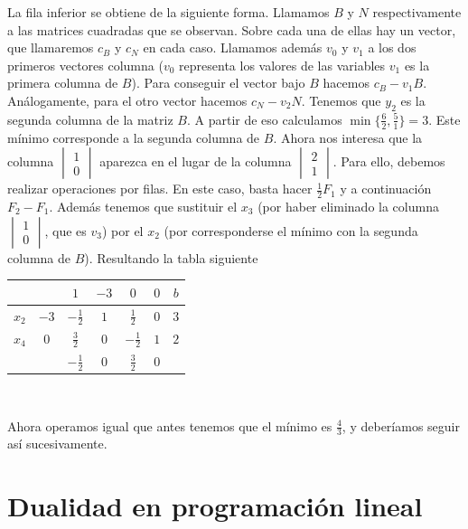 \documentclass[PM.tex]{subfiles}
\begin{document}
La fila inferior se obtiene de la siguiente forma. Llamamos $B$ y $N$ respectivamente a las matrices cuadradas que se observan. Sobre cada una de ellas hay un vector, que llamaremos $c_B$ y $c_N$ en cada caso. Llamamos además $v_0$ y $v_1$ a los dos primeros vectores columna ($v_0$ representa los valores de las variables $v_1$ es la primera columna de $B$). Para conseguir el vector bajo $B$ hacemos $c_B-v_1 B$. Análogamente, para el otro vector hacemos $c_N-v_2 N$. Tenemos que $y_2$ es la segunda columna de la matriz $B$. A partir de eso calculamos $\min\{\frac{6}{2}, \frac{5}{1}\}=3$. Este mínimo corresponde a la segunda columna de $B$. Ahora nos interesa que la columna $\begin{vmatrix}
1\\
0
\end{vmatrix}$ aparezca en el lugar de la columna $\begin{vmatrix}
2\\
1
\end{vmatrix}$. Para ello, debemos realizar operaciones por filas. En este caso, basta hacer $\frac{1}{2}F_1$ y a continuación $F_2-F_1$. Además tenemos que sustituir el $x_3$ (por haber eliminado la columna $\begin{vmatrix}
1\\
0
\end{vmatrix}$, que es $v_3$) por el $x_2$ (por corresponderse el mínimo con la segunda columna de $B$). Resultando la tabla siguiente

\begin{tabular}{|c|c| c c| c c|c|}
\hline
 &            & $1$ & $-3$ & $0$ & $0$ & $b$  \\
 \hline
 $x_2$ & $-3$ & $-\frac{1}{2}$ & $1$ &   $\frac{1}{2}$ &   $0$ & $3$\\
  $x_4$ & $0$ & $\frac{3}{2}$ & $0$ &    $-\frac{1}{2}$ &  $1$ & $2$\\
 \hline
 &            & $\boxed{-\frac{1}{2}}$ & $0$ & $\frac{3}{2}$ & $0$ & \\
 \hline

\end{tabular}\

Ahora operamos igual que antes tenemos que el mínimo es $\frac{4}{3}$, y deberíamos seguir así sucesivamente.



\chapter{Dualidad en programación lineal}
\end{document}
